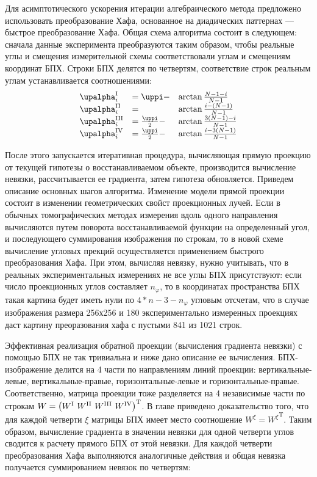 Для асимптотического ускорения итерации алгебраического метода предложено использовать преобразование Хафа, основанное на диадических паттернах --- быстрое преобразование Хафа.
Общая схема алгоритма состоит в следующем: сначала данные эксперимента преобразуются таким образом, чтобы реальные углы и смещения измерительной схемы соответствовали углам и смещениям координат БПХ.
Строки БПХ делятся по четвертям, соответствие строк реальным углам устанавливается соотношениями:
\begin{equation} \notag
\begin{array}{lll}
\alpha^\rom{1}_i &= \pi - & \arctan{\frac{N-1-i}{N-1}} \\
\alpha^\rom{2}_i &= &\arctan{\frac{i - (N-1)}{N-1}} \\
\alpha^\rom{3}_i &= \frac \pi 2 - & \arctan{\frac{3(N-1)-i}{N-1}} \\
\alpha^\rom{4}_i &= \frac \pi 2 - & \arctan{\frac{i - 3(N-1)}{N-1}}
\end{array}
\end{equation}


После этого запускается итеративная процедура, вычисляющая прямую проекцию от текущей гипотезы о восстанавливаемом объекте, производится вычисление невязки, рассчитывается ее градиента, затем гипотеза обновляется.
Приведем описание основных шагов алгоритма.
Изменение модели прямой проекции состоит в изменении геометрических свойст проекционных лучей. 
Если в обычных томографических методах измерения вдоль одного направления вычисляются путем поворота восстанавливаемой функции на определенный угол, и последующего суммирования изображения по строкам, то в новой схеме вычисление угловых прекций осуществляется применением быстрого преобразования Хафа.
При этом, вычисляя невязку, нужно учитывать, что в реальных экспериментальных измерениях не все углы БПХ присутствуют: если число проекционных углов составляет $n_\varphi$, то в координатах пространства БПХ такая картина будет иметь нули по $4 * n - 3 - n_\varphi$ угловым отсчетам, что в случае изображения размера 256х256 и 180 экспериментально измеренных проекциях даст картину преоразования хафа с пустыми 841 из 1021 строк.

Эффективная реализация обратной проекции (вычисления градиента невязки) с помощью БПХ не так тривиальна и ниже дано описание ее вычисления.
БПХ-изображение делится на 4 части по направлениям линий проекции: вертикальные-левые, вертикальные-правые, горизонтальные-левые и горизонтальные-правые.
Соответственно, матрица проекции тоже разделяется на 4 независимые части по строкам $W = \left( W^\rom{1}\ W^\rom{2}\ W^\rom{3}\ W^\rom{4} \right)^{\mathrm T}$.
В главе приведено доказательство того, что для каждой четверти $\xi$ матрицы БПХ имеет место соотношение $W^\xi = {W^\xi}^{\mathrm T}$.
Таким образом, вычисление градиента в значении невязки для одной четверти углов сводится к расчету прямого БПХ от этой невязки.  
Для каждой четверти преобразования Хафа выполняются аналогичные действия и общая невязка получается суммированием невязок по четвертям:

